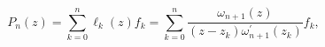 \[P_{n}(z)=\sum_{k=0}^{n}\ell_{k}(z)f_{k}=\sum_{k=0}^{n}\frac{\omega_{n+1}(z)}{(%
z-z_{k})\omega_{n+1}^{\prime}(z_{k})}f_{k},\]